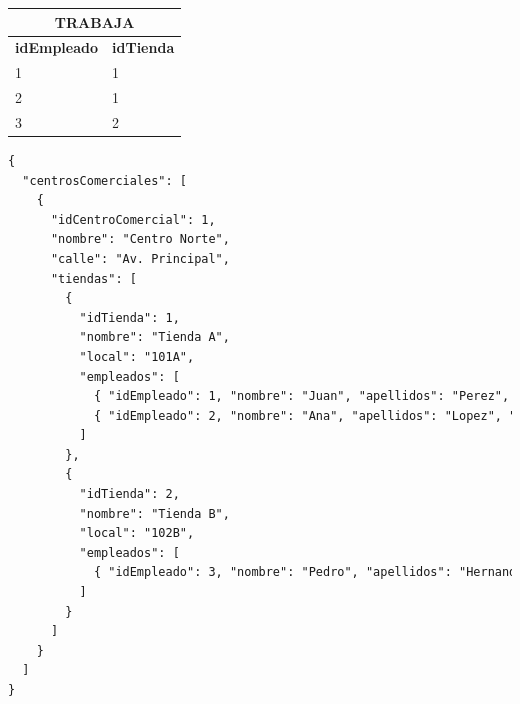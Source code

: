 \documentclass[12pt,a4paper,addpoints,answers]{exam}
\begin{document}
\begin{questions}
\begin{table}[h!]
\centering
\small
\begin{tabular}{|p{2.5cm}|p{2.5cm}|}
\multicolumn{2}{c}{\textbf{TRABAJA}} \\ \hline
\textbf{idEmpleado} & \textbf{idTienda} \\ \hline
1                     & 1                   \\ \hline
2                     & 1                   \\ \hline
3                     & 2                   \\ \hline
\end{tabular}
\end{table}

\begin{solution}
\begin{lstlisting}[language=HTML]
{
  "centrosComerciales": [
    {
      "idCentroComercial": 1,
      "nombre": "Centro Norte",
      "calle": "Av. Principal",
      "tiendas": [
        {
          "idTienda": 1,
          "nombre": "Tienda A",
          "local": "101A",
          "empleados": [            
            { "idEmpleado": 1, "nombre": "Juan", "apellidos": "Perez", "edad": 30, "sueldo": 1600 },
            { "idEmpleado": 2, "nombre": "Ana", "apellidos": "Lopez", "edad": 25, "sueldo": 1400 }
          ]
        },
        {
          "idTienda": 2,
          "nombre": "Tienda B",
          "local": "102B",
          "empleados": [
            { "idEmpleado": 3, "nombre": "Pedro", "apellidos": "Hernandez", "edad": 40, "sueldo": 1700 }
          ]
        }
      ]
    }
  ]
}
\end{lstlisting}       
\end{solution}


\end{questions}
\end{document}
